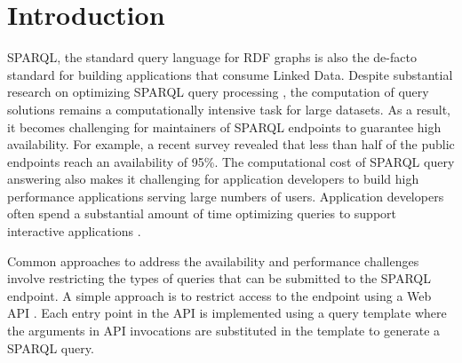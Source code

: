 \section{Introduction}
SPARQL, the standard query language for RDF graphs is also the de-facto standard for building applications that consume Linked Data. 
Despite substantial research on optimizing SPARQL query processing \cite{Pham2013}, the computation of query solutions remains a computationally intensive task for large datasets.
As a result, it becomes challenging for maintainers of SPARQL endpoints to guarantee high availability.
For example, a recent survey \cite{buil2013sparql} revealed that less than half of the public endpoints reach an availability of 95\%.
The computational cost of SPARQL query answering also makes it challenging for application developers to build high performance applications serving large numbers of users.
Application developers often spend a substantial amount of time optimizing queries to support interactive applications \cite{Loizou_Angles_Groth_2014}.

Common approaches to address the availability and performance challenges involve restricting the types of queries that can be submitted to the SPARQL endpoint.
A simple approach is to restrict access to the endpoint using a Web API \cite{Groth_Loizou_Gray_Goble_Harland_Pettifer_2014}.
Each entry point in the API is implemented using a query template where the arguments in API invocations are substituted in the template to generate a SPARQL query.